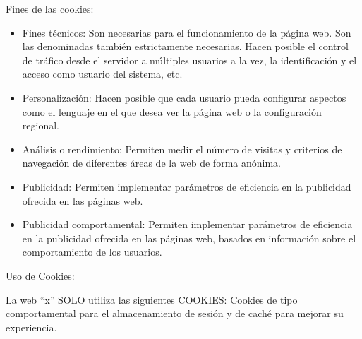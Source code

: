 \documentclass[
  spanish,
  a4paper,
  openany]{book}
\begin{document}
Fines de las cookies:

\begin{itemize}
\item
  Fines técnicos: Son necesarias para el funcionamiento de la página web. Son las denominadas también estrictamente necesarias. Hacen posible el control de tráfico desde el servidor a múltiples usuarios a la vez, la identificación y el acceso como usuario del sistema, etc.
\item
  Personalización: Hacen posible que cada usuario pueda configurar aspectos como el lenguaje en el que desea ver la página web o la configuración regional.
\item
  Análisis o rendimiento: Permiten medir el número de visitas y criterios de navegación de diferentes áreas de la web de forma anónima.
\item
  Publicidad: Permiten implementar parámetros de eficiencia en la publicidad ofrecida en las páginas web.
\item
  Publicidad comportamental: Permiten implementar parámetros de eficiencia en la publicidad ofrecida en las páginas web, basados en información sobre el comportamiento de los usuarios.
\end{itemize}

Uso de Cookies:

La web ``x'' SOLO utiliza las siguientes COOKIES: Cookies de tipo comportamental para el almacenamiento de sesión y de caché para mejorar su experiencia.
\end{document}

